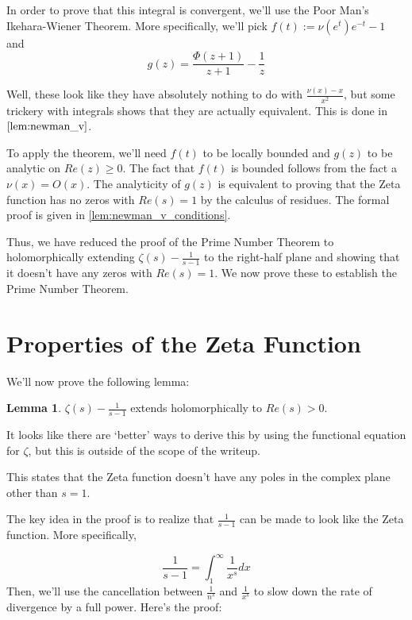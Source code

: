 \documentclass{article}
\theoremstyle{definition}
\newtheorem{lemma}[theorem]{Lemma}
\begin{document}
In order to prove that this integral is convergent, we'll use the Poor Man's Ikehara-Wiener Theorem.
More specifically, we'll pick $ f(t) := \nu(e^{t}) e^{-t} -1 $ and 
\[ g(z) = \frac{\Phi(z+1)}{z+1} - \frac{1}{z} \]

Well, these look like they have absolutely nothing to do with $ \frac{\nu(x) - x}{x^{2}} $,
but some trickery with integrals shows that they are actually equivalent. This
is done in $ \ref{lem:newman_v} $.

To apply the theorem, we'll need $ f(t) $ to be locally bounded 
and $ g(z) $ to be analytic on $ Re(z) \geq 0 $.
The fact that $ f(t) $ is bounded follows from the fact a $ \nu(x) = O(x) $. The analyticity of $ g(z) $ is equivalent to proving
that the Zeta function has no zeros with $ Re(s) = 1 $ by the calculus of residues. 
The formal proof is given in \ref{lem:newman_v_conditions}.

Thus, we have reduced the proof of the Prime Number Theorem to holomorphically
extending $ \zeta(s) - \frac{1}{s - 1} $ to the right-half plane and showing that it doesn't
have any zeros with $ Re(s) = 1 $. We now prove these to establish the Prime Number Theorem.

\section{Properties of the Zeta Function}

We'll now prove the following lemma:

\begin{lemma}
    $ \zeta(s) - \frac{1}{s - 1} $ extends holomorphically to $ Re(s) > 0 $.
\end{lemma}

It looks like there are `better' ways to derive this by using the functional equation
for $ \zeta $, but this is outside of the scope of the writeup.

This states that the Zeta function doesn't have any poles in the complex plane
other than $ s = 1 $.

The key idea in the proof is to realize that $ \frac{1}{s - 1} $
can be made to look like the Zeta function. More specifically,

\[ \frac{1}{s-1} = \int_{1}^{\infty} \frac{1}{x^{s}} dx\]
Then, we'll use the cancellation between $ \frac{1}{n^{s}} $ and
$ \frac{1}{x^{s}} $ to slow down the rate of divergence by a full power.
Here's the proof:
\end{document}
